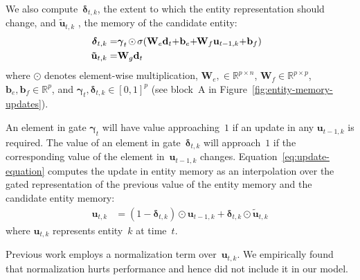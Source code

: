 \documentclass[11pt,a4paper]{article}
\begin{document}
We also  compute~$\boldsymbol{\delta}_{t,k}$,  the extent to
which the entity representation should change, and
$\mathbf{\tilde{u}}_{t,k}$ , the memory of the candidate entity:
\begin{align}
\hspace*{-.4ex}\boldsymbol{\delta}_{t,k}  =&  \boldsymbol{\gamma}_t \hspace*{-.2ex}\odot\hspace*{-.2ex} \sigma
(\mathbf{W}_e \mathbf{d}_t \hspace*{-.5ex}+\hspace*{-.5ex}\mathbf{b}_e\hspace*{-.5ex}+\hspace*{-.7ex}\mathbf{W}_f
\mathbf{u}_{t-1,k} \hspace*{-.5ex}+\hspace*{-.5ex} \mathbf{b}_f)~~\label{eq:delta:attention} \\
\mathbf{\tilde{u}}_{t,k} =&
\mathbf{W}_g\mathbf{d}_t\label{eq:tilde-u} 
\end{align}
where $\odot$ denotes element-wise multiplication,
$\mathbf{W}_e, \in \mathbb{R}^{p \times n}$,
$\mathbf{W}_f \in \mathbb{R}^{p \times p}$,
$\mathbf{b}_e, \mathbf{b}_f \in \mathbb{R}^{p}$, and
$\boldsymbol{\gamma}_t, \boldsymbol{\delta}_{t,k} \in [0,1]^p$
(see block~A in
Figure~\ref{fig:entity-memory-updates}).  

An element in gate $\boldsymbol{\gamma}_t$ will have value
approaching~$1$ if an update in any $\mathbf{u}_{t-1,k}$ is required.
The value of an element in gate~$\boldsymbol{\delta}_{t,k}$ will
approach~$1$ if the corresponding value of the element
in~$\mathbf{u}_{t-1,k}$ changes. Equation~\eqref{eq:update-equation}
computes the update in entity memory as an interpolation over the
gated representation of the previous value of the entity memory and
the candidate entity memory:
\begin{align}
\mathbf{u}_{t,k} &= (1-\boldsymbol{\delta}_{t,k})\odot\mathbf{u}_{t-1,k} + \boldsymbol{\delta}_{t,k}\odot \mathbf{\tilde{u}}_{t,k}  \label{eq:update-equation}
\end{align}
where $\mathbf{u}_{t,k}$ represents entity~$k$ at time~$t$.

Previous work \cite{DBLP:conf/iclr/HenaffWSBL17,D17-1195,N18-1204} employs a
normalization term over~$\mathbf{u}_{t,k}$. We empirically found that
normalization hurts performance and hence did not include it in our
model.
\end{document}
